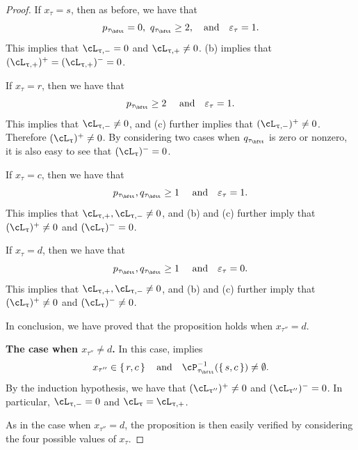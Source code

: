\documentclass[11pt,a4paper]{amsart}
\newcommand{\be}{\begin {equation}}
\newcommand{\ee}{\end {equation}}
\numberwithin{equation}{section}
\theoremstyle{remark}
\def\ac{\cL}
\begin{document}
\begin{proof}
If  $x_\tau=s$, then as before, we have that
\[
p_{\tau_\bftt}=0,\  q_{\tau_\bftt}\geq 2,\quad \textrm{and}\quad  \varepsilon_\tau=1.
\]
This implies that $\ac_{\uptau,-}=0$ and $\ac_{\uptau,+}\neq 0$.  (b) implies that
$(\ac_{\uptau,+})^+=(\ac_{\uptau,+})^-=0$.

If  $x_\tau=r$, then we have that
\[
p_{\tau_\bftt}\geq 2\  \quad \textrm{and}\quad  \varepsilon_\tau=1.
\]
This implies that $\ac_{\uptau,-}\neq 0$, and  (c) further implies that $(\ac_{\uptau,-})^+\neq 0$.
Therefore  $(\ac_{\uptau})^+\neq 0$. By considering two cases when $q_{\tau_\bftt}$ is zero or nonzero, it is also easy to see that $(\ac_{\uptau})^-= 0$.

If  $x_\tau=c$, then we have that
\[
p_{\tau_\bftt}, q_{\tau_\bftt}\geq 1\  \quad \textrm{and}\quad  \varepsilon_\tau=1.
\]
This implies that $\ac_{\uptau,+},\ac_{\uptau,-}\neq 0$, and  (b) and (c) further imply that $(\ac_{\uptau})^+\neq 0$ and $(\ac_{\uptau})^-= 0$.

If  $x_\tau=d$, then we have that
\[
p_{\tau_\bftt}, q_{\tau_\bftt}\geq 1\  \quad \textrm{and}\quad  \varepsilon_\tau=0.
\]
This implies that $\ac_{\uptau,+},\ac_{\uptau,-}\neq 0$, and  (b) and (c) further imply that $(\ac_{\uptau})^+\neq 0$ and $(\ac_{\uptau})^-\neq 0$.

In conclusion, we have proved that  the proposition holds when $x_{\tau''}=d$.

{\bf The case when  $x_{\tau''}\neq d$.} In this case,   implies
\be\label{taunotd}
x_{\tau''}\in \set{r,c}\quad\textrm{and}\quad
    \cP_{\tau_\bftt}^{-1}(\set{s,c})\neq \emptyset.
    \ee
    By the induction hypothesis, we have that $(\ac_{\uptau''})^+\neq 0$ and $(\ac_{\uptau''})^-= 0$.
     In particular, $\ac_{\uptau,-}=0$ and $\ac_\uptau=\ac_{\uptau,+}$.

    As in the case when $x_{\tau''}=d$, the proposition is then  easily verified by considering the four possible values of $x_\tau$.
\end{proof}
\end{document}
